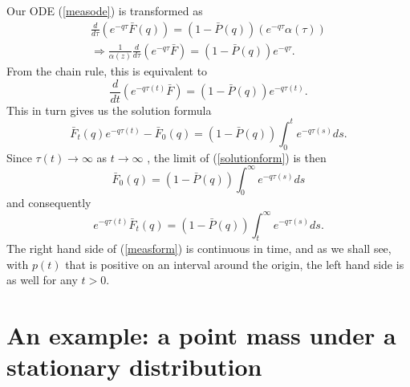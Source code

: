 Our ODE (\ref{measode}) is transformed as 
\begin{eqnarray}
\frac d{d\tau}(e^{-q\tau}\bar F(q)) = (1-\bar P(q))(e^{-q\tau}\alpha(\tau)) \\  \Rightarrow \frac 1{\alpha(z)}\frac d{d\tau}(e^{-q \tau}\bar F) =(1-\bar P(q))e^{-q\tau}\nonumber.
\end{eqnarray}
From the chain rule, this is equivalent to
\begin{equation}
\frac d{dt}(e^{-q \tau(t)}\bar F) =(1-\bar P(q))e^{-q\tau(t)}.
\end{equation}
This in turn gives us the solution formula
\begin{equation}\label{solutionform}
\bar F_t(q)e^{-q\tau(t)} - \bar F_0(q) = (1-\bar P(q))\int_0^t e^{-q\tau(s)}ds.
\end{equation}
Since $\tau(t) \rightarrow \infty$ as $t\rightarrow \infty$ , the limit of (\ref{solutionform}) is then
\begin{equation}\label{initmeas}
\bar F_0(q)= (1-\bar P(q))\int_0^\infty e^{-q\tau(s)}ds
\end{equation}
and consequently
\begin{equation}\label{measform}
e^{-q\tau(t)}\bar F_t(q) = (1-\bar P(q))\int_t^\infty e^{-q\tau(s)}ds.
\end{equation}
The right hand side of (\ref{measform}) is continuous in time, and as we shall see, with $p(t)$ that is positive on an interval around the origin, the left hand side is as well for any $t>0$.

\section{An example: a point mass under a stationary distribution}\label{ptmass}

